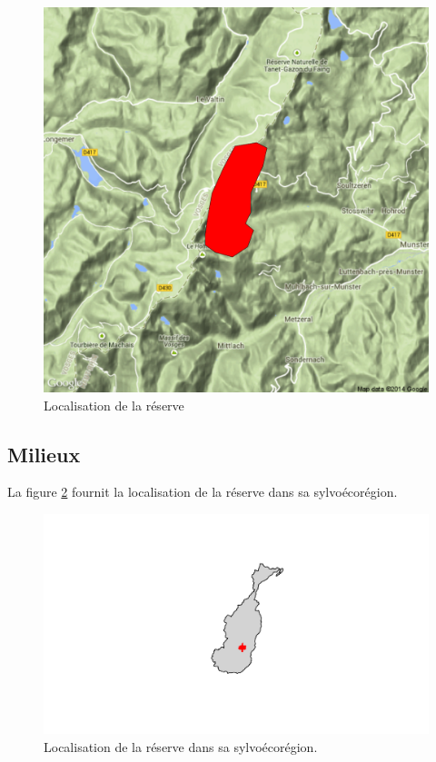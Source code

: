\documentclass[a4paper]{book}\usepackage[]{graphicx}\usepackage[]{color}
\makeatletter
\def\maxwidth{ %
  \ifdim\Gin@nat@width>\linewidth
    \linewidth
  \else
    \Gin@nat@width
  \fi
}
\newenvironment{knitrout}{}{} %
\makeatother
\begin{document}
\begin{knitrout}
\color{fgcolor}\begin{figure}[H]


{\centering \includegraphics[width=.7\linewidth,scale=1]{Figures/PlanLoc-1} 

}

\caption[Localisation de la réserve]{Localisation de la réserve\label{fig:PlanLoc}}
\end{figure}


\end{knitrout}



\subsection{Milieux}

La figure \ref{fig:CarteSER} fournit la localisation de la réserve dans sa sylvoécorégion.

\begin{knitrout}
\color{fgcolor}\begin{figure}[h]


{\centering \includegraphics[width=\maxwidth]{Figures/CarteSER-1} 

}

\caption[Localisation de la réserve dans sa sylvoécorégion]{Localisation de la réserve dans sa sylvoécorégion.\label{fig:CarteSER}}
\end{figure}


\end{knitrout}
\end{document}
